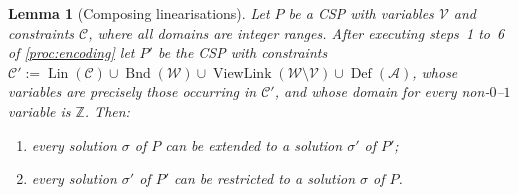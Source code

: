 \documentclass[11pt,a4paper]{article}
\theoremstyle{plain}
\newtheorem{lemmaT}{Lemma}
\theoremstyle{definition}
\theoremstyle{remark}
\newcommand{\fname}[1]{\ensuremath{\operatorname{#1}}}
\newcommand{\Bnd}{\fname{Bnd}}
\newcommand{\Def}{\fname{Def}}
\newcommand{\Lin}{\fname{Lin}}
\newcommand{\ViewLink}{\fname{ViewLink}}
\begin{document}
\begin{lemmaT}[Composing linearisations]
\label{lem:composing}
Let $P$ be a CSP with variables $\mathcal V$ and constraints $\mathcal C$,
where all domains are integer ranges.  After executing steps~1 to~6 of
\cref{proc:encoding} let $P'$ be the CSP with constraints
$\mathcal C' := \Lin(\mathcal C)\cup\Bnd(\mathcal W)\cup\ViewLink(\mathcal W\setminus\mathcal V)
\cup\Def(\mathcal A)$, whose variables are precisely those occurring in
$\mathcal C'$, and whose domain for every non-$0$--$1$ variable is $\mathbb Z$.
Then:
\begin{enumerate}[label=\arabic*.,itemsep=0pt]
  \item every solution $\sigma$ of $P$ can be extended to a solution $\sigma'$
    of $P'$;
  \item every solution $\sigma'$ of $P'$ can be restricted to a solution
    $\sigma$ of $P$.
\end{enumerate}
\end{lemmaT}
\end{document}

